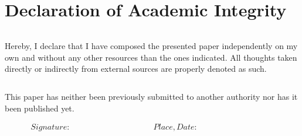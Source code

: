 \section*{Declaration of Academic Integrity}
\thispagestyle{empty}

\begin{verbatim}

\end{verbatim}

Hereby, I declare that I have composed the presented paper independently on my own and without any other resources than the ones indicated. All thoughts taken directly or indirectly from external sources are properly denoted as such.

\begin{verbatim}

\end{verbatim}

This paper has neither been previously submitted to another authority nor has it been published yet.



\begin{displaymath}
\begin{array}{ll}
Signature:~~~~~~~~~~~~~~~~~~~~~~~~~~~~~~~~~~~~~~~~~~
& Place, Date:~~~~~~~~~~~~~~~~~~~~~~~~~~~~~~~~~~~~~~~~~~
\end{array}
\end{displaymath}
